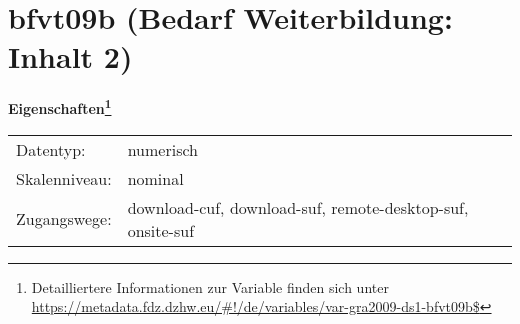 
    \setcounter{footnote}{0}

    \vspace*{-1.8cm}
	\section{bfvt09b (Bedarf Weiterbildung: Inhalt 2)}
	\label{section:bfvt09b}



    \vspace*{0.5cm}
    \noindent\textbf{Eigenschaften\footnote{Detailliertere Informationen zur Variable finden sich unter
		\url{https://metadata.fdz.dzhw.eu/\#!/de/variables/var-gra2009-ds1-bfvt09b$}}}\\
	\begin{tabularx}{\hsize}{@{}lX}
	Datentyp: & numerisch \\
	Skalenniveau: & nominal \\
	Zugangswege: &
	  download-cuf, 
	  download-suf, 
	  remote-desktop-suf, 
	  onsite-suf
 \\
    \end{tabularx}



